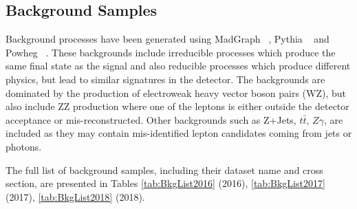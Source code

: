 \subsection{Background Samples}

Background processes have been generated using
MadGraph ~\cite{madgraph}, Pythia ~\cite{pythia} and Powheg ~\cite{powhegbox}.
These backgrounds include irreducible processes which produce the
same final state as the signal and also reducible processes which produce
different physics, but lead to similar signatures in the detector. The backgrounds
are dominated by the production of electroweak heavy vector boson pairs (WZ), but
also include ZZ production where one of the leptons is either outside the detector
acceptance or mis-reconstructed. Other backgrounds such as Z+Jets, $t\bar{t}$,
$Z\gamma$, are included as they may contain mis-identified lepton candidates
coming from jets or photons.

The full list of background samples, including their dataset name and cross
section, are presented in Tables \ref{tab:BkgList2016} (2016),
\ref{tab:BkgList2017}(2017), \ref{tab:BkgList2018} (2018).

